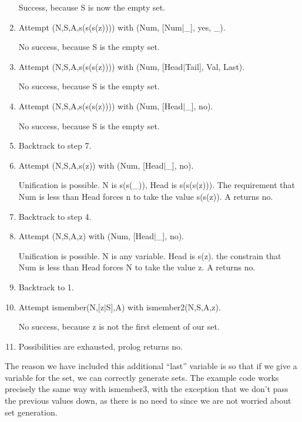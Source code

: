 \documentclass{article}
\begin{document}
\begin{enumerate}
         Success, because S is now the empty set.

    \item   Attempt (N,S,A,s(s(s(z)))) with (Num, [Num|\_], yes, \_).

         No success, because S is the empty set.

    \item  Attempt (N,S,A,s(s(s(z)))) with (Num, [Head$\vert$Tail], Val, Last).

         No success, because S is the empty set.

    \item  Attempt (N,S,A,s(s(s(z)))) with (Num, [Head$\vert$\_], no).

         No success, because S is the empty set.

    \item  Backtrack to step 7.

    \item  Attempt (N,S,A,s(z)) with (Num, [Head$\vert$\_], no).

         Unification is possible. N is s(s(\_)), Head is s(s(s(z))). The requirement that Num is less than Head forces n to take the value s(s(z)). A returns no.

    \item  Backtrack to step 4.

    \item  Attempt (N,S,A,z) with (Num, [Head$\vert$\_], no).

         Unification is possible. N is any variable. Head is s(z). the constrain that Num is less than Head forces N to take the value z. A returns no.

    \item  Backtrack to 1.

    \item  Attempt ismember(N,[z$\vert$S],A) with ismember2(N,S,A,z).

         No success, because z is not the first element of our set.

    \item  Possibilities are exhausted, prolog returns no.
\end{enumerate}

The reason we have included this additional ``last'' variable is so that if we give a variable for the set, we can correctly generate sets.
The example code works precisely the same way with ismember3, with the exception that we don't pass the previous values down, as there is no need to since we are not worried about set generation.
\end{document}
